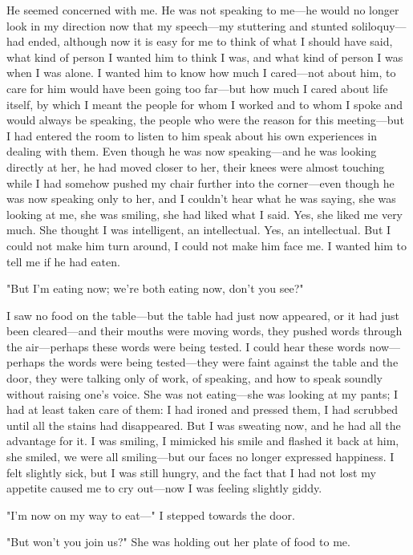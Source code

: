\documentclass[
]{memoir}
\begin{document}
He seemed concerned with me. He was not speaking to me---he would no
longer look in my direction now that my speech---my stuttering and
stunted soliloquy---had ended, although now it is easy for me to think
of what I should have said, what kind of person I wanted him to think I
was, and what kind of person I was when I was alone. I wanted him to
know how much I cared---not about him, to care for him would have been
going too far---but how much I cared about life itself, by which I meant
the people for whom I worked and to whom I spoke and would always be
speaking, the people who were the reason for this meeting---but I had
entered the room to listen to him speak about his own experiences in
dealing with them. Even though he was now speaking---and he was looking
directly at her, he had moved closer to her, their knees were almost
touching while I had somehow pushed my chair further into the
corner---even though he was now speaking only to her, and I couldn't
hear what he was saying, she was looking at me, she was smiling, she had
liked what I said. Yes, she liked me very much. She thought I was
intelligent, an intellectual. Yes, an intellectual. But I could not make
him turn around, I could not make him face me. I wanted him to tell me
if he had eaten.

"But I'm eating now; we're both eating now, don't you see?"

I saw no food on the table---but the table had just now appeared, or it
had just been cleared---and their mouths were moving words, they pushed
words through the air---perhaps these words were being tested. I could
hear these words now---perhaps the words were being tested---they were
faint against the table and the door, they were talking only of work, of
speaking, and how to speak soundly without raising one's voice. She was
not eating---she was looking at my pants; I had at least taken care of
them: I had ironed and pressed them, I had scrubbed until all the stains
had disappeared. But I was sweating now, and he had all the advantage
for it. I was smiling, I mimicked his smile and flashed it back at him,
she smiled, we were all smiling---but our faces no longer expressed
happiness. I felt slightly sick, but I was still hungry, and the fact
that I had not lost my appetite caused me to cry out---now I was feeling
slightly giddy.

"I'm now on my way to eat---" I stepped towards the door.

"But won't you join us?" She was holding out her plate of food to me.
\end{document}
